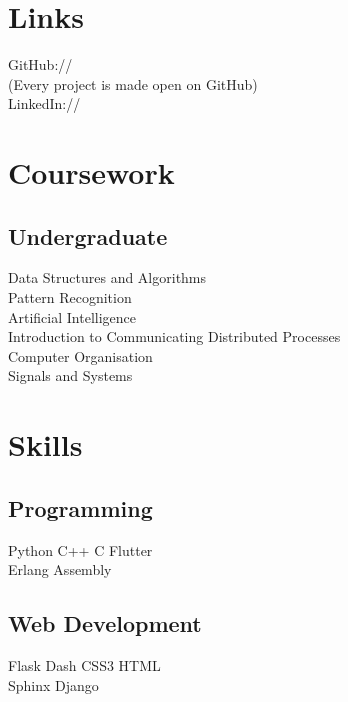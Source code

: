 \documentclass[a4paper]{deedy-resume-openfont}
\begin{document}
\begin{minipage}[t]{0.33\textwidth}

\section{Links} 
GitHub:// \href{https://github.com/shreyasbapat}{} \\
(Every project is made open on GitHub)\\
LinkedIn://  \href{https://www.linkedin.com/in/shreyasbapat}{} \\


\section{Coursework}

\subsection{Undergraduate}
Data Structures and Algorithms\\
Pattern Recognition\\
Artificial Intelligence\\
Introduction to Communicating Distributed Processes\\
Computer Organisation\\
Signals and Systems


\section{Skills}
\subsection{Programming}
Python \textbullet{}  C++ \textbullet{} C \textbullet{}
Flutter\\ Erlang \textbullet{} Assembly \\

\subsection{Web Development}
Flask \textbullet{}  Dash \textbullet{} CSS3 \textbullet{} HTML\\
Sphinx \textbullet{} Django\\

\end{minipage}
\end{document}
